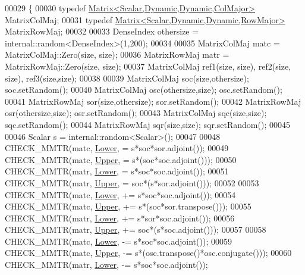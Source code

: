 \begin{DoxyCode}
00029 \{
00030   \textcolor{keyword}{typedef} \hyperlink{group___core___module_class_eigen_1_1_matrix}{Matrix<Scalar,Dynamic,Dynamic,ColMajor>} MatrixColMaj;
00031   \textcolor{keyword}{typedef} \hyperlink{group___core___module_class_eigen_1_1_matrix}{Matrix<Scalar,Dynamic,Dynamic,RowMajor>} MatrixRowMaj;
00032 
00033   DenseIndex othersize = internal::random<DenseIndex>(1,200);
00034   
00035   MatrixColMaj matc = MatrixColMaj::Zero(size, size);
00036   MatrixRowMaj matr = MatrixRowMaj::Zero(size, size);
00037   MatrixColMaj ref1(size, size), ref2(size, size), ref3(size,size);
00038   
00039   MatrixColMaj soc(size,othersize); soc.setRandom();
00040   MatrixColMaj osc(othersize,size); osc.setRandom();
00041   MatrixRowMaj sor(size,othersize); sor.setRandom();
00042   MatrixRowMaj osr(othersize,size); osr.setRandom();
00043   MatrixColMaj sqc(size,size); sqc.setRandom();
00044   MatrixRowMaj sqr(size,size); sqr.setRandom();
00045   
00046   Scalar s = internal::random<Scalar>();
00047   
00048   CHECK\_MMTR(matc, \hyperlink{group__enums_gga39e3366ff5554d731e7dc8bb642f83cda891792b8ed394f7607ab16dd716f60e6}{Lower}, = s*soc*sor.adjoint());
00049   CHECK\_MMTR(matc, \hyperlink{group__enums_gga39e3366ff5554d731e7dc8bb642f83cda6bcb58be3b8b8ec84859ce0c5ac0aaec}{Upper}, = s*(soc*soc.adjoint()));
00050   CHECK\_MMTR(matr, \hyperlink{group__enums_gga39e3366ff5554d731e7dc8bb642f83cda891792b8ed394f7607ab16dd716f60e6}{Lower}, = s*soc*soc.adjoint());
00051   CHECK\_MMTR(matr, \hyperlink{group__enums_gga39e3366ff5554d731e7dc8bb642f83cda6bcb58be3b8b8ec84859ce0c5ac0aaec}{Upper}, = soc*(s*sor.adjoint()));
00052   
00053   CHECK\_MMTR(matc, \hyperlink{group__enums_gga39e3366ff5554d731e7dc8bb642f83cda891792b8ed394f7607ab16dd716f60e6}{Lower}, += s*soc*soc.adjoint());
00054   CHECK\_MMTR(matc, \hyperlink{group__enums_gga39e3366ff5554d731e7dc8bb642f83cda6bcb58be3b8b8ec84859ce0c5ac0aaec}{Upper}, += s*(soc*sor.transpose()));
00055   CHECK\_MMTR(matr, \hyperlink{group__enums_gga39e3366ff5554d731e7dc8bb642f83cda891792b8ed394f7607ab16dd716f60e6}{Lower}, += s*sor*soc.adjoint());
00056   CHECK\_MMTR(matr, \hyperlink{group__enums_gga39e3366ff5554d731e7dc8bb642f83cda6bcb58be3b8b8ec84859ce0c5ac0aaec}{Upper}, += soc*(s*soc.adjoint()));
00057   
00058   CHECK\_MMTR(matc, \hyperlink{group__enums_gga39e3366ff5554d731e7dc8bb642f83cda891792b8ed394f7607ab16dd716f60e6}{Lower}, -= s*soc*soc.adjoint());
00059   CHECK\_MMTR(matc, \hyperlink{group__enums_gga39e3366ff5554d731e7dc8bb642f83cda6bcb58be3b8b8ec84859ce0c5ac0aaec}{Upper}, -= s*(osc.transpose()*osc.conjugate()));
00060   CHECK\_MMTR(matr, \hyperlink{group__enums_gga39e3366ff5554d731e7dc8bb642f83cda891792b8ed394f7607ab16dd716f60e6}{Lower}, -= s*soc*soc.adjoint());

\end{DoxyCode}
